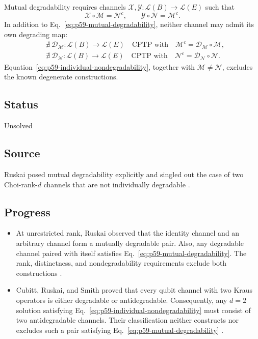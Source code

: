 Mutual degradability requires channels
$\mathcal X,\mathcal Y:\mathcal L(B)\to\mathcal L(E)$ such that
\begin{equation}
  \mathcal X\circ\mathcal M=\mathcal N^c,
  \qquad
  \mathcal Y\circ\mathcal N=\mathcal M^c.
  \label{eq:p59-mutual-degradability}
\end{equation}
In addition to Eq.~\eqref{eq:p59-mutual-degradability}, neither channel may
admit its own degrading map:
\begin{equation}
  \begin{aligned}
    &\nexists\ \mathcal D_{\mathcal M}:\mathcal L(B)\to\mathcal L(E)
      \quad\text{CPTP with}\quad
      \mathcal M^c=\mathcal D_{\mathcal M}\circ\mathcal M,\\
    &\nexists\ \mathcal D_{\mathcal N}:\mathcal L(B)\to\mathcal L(E)
      \quad\text{CPTP with}\quad
      \mathcal N^c=\mathcal D_{\mathcal N}\circ\mathcal N.
  \end{aligned}
  \label{eq:p59-individual-nondegradability}
\end{equation}
Equation~\eqref{eq:p59-individual-nondegradability}, together with
$\mathcal M\neq\mathcal N$, excludes the known degenerate constructions.

\subsection*{Status}

Unsolved

\subsection*{Source}

Ruskai posed mutual degradability explicitly and singled out the case of two
Choi-rank-$d$ channels that are not individually degradable
.

\subsection*{Progress}

\begin{itemize}
  \item At unrestricted rank, Ruskai observed that the identity channel and an
  arbitrary channel form a mutually degradable pair.  Also, any degradable
  channel paired with itself satisfies
  Eq.~\eqref{eq:p59-mutual-degradability}.  The rank, distinctness, and
  nondegradability requirements exclude both constructions
  .

  \item Cubitt, Ruskai, and Smith proved that every qubit channel with two
  Kraus operators is either degradable or antidegradable.  Consequently, any
  $d=2$ solution satisfying Eq.~\eqref{eq:p59-individual-nondegradability}
  must consist of two antidegradable channels.  Their classification neither
  constructs nor excludes such a pair satisfying
  Eq.~\eqref{eq:p59-mutual-degradability}
  .
\end{itemize}

